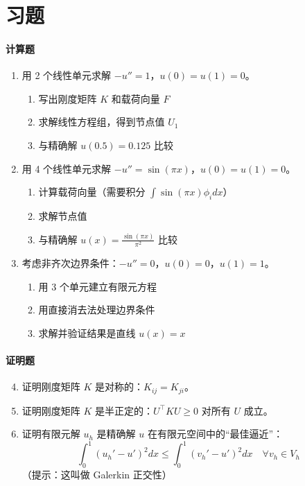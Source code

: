 \section{习题}

\paragraph{计算题}
\begin{enumerate}
    \item 用 2 个线性单元求解 $-u'' = 1$，$u(0) = u(1) = 0$。
    \begin{enumerate}
        \item 写出刚度矩阵 $K$ 和载荷向量 $F$
        \item 求解线性方程组，得到节点值 $U_1$
        \item 与精确解 $u(0.5) = 0.125$ 比较
    \end{enumerate}
    
    \item 用 4 个线性单元求解 $-u'' = \sin(\pi x)$，$u(0) = u(1) = 0$。
    \begin{enumerate}
        \item 计算载荷向量（需要积分 $\int \sin(\pi x) \phi_i dx$）
        \item 求解节点值
        \item 与精确解 $u(x) = \frac{\sin(\pi x)}{\pi^2}$ 比较
    \end{enumerate}
    
    \item 考虑非齐次边界条件：$-u'' = 0$，$u(0) = 0$，$u(1) = 1$。
    \begin{enumerate}
        \item 用 3 个单元建立有限元方程
        \item 用直接消去法处理边界条件
        \item 求解并验证结果是直线 $u(x) = x$
    \end{enumerate}
\end{enumerate}

\paragraph{证明题}
\begin{enumerate}
    \setcounter{enumi}{3}
    \item 证明刚度矩阵 $K$ 是对称的：$K_{ij} = K_{ji}$。
    
    \item 证明刚度矩阵 $K$ 是半正定的：$U^\top K U \geq 0$ 对所有 $U$ 成立。
    
    \item 证明有限元解 $u_h$ 是精确解 $u$ 在有限元空间中的“最佳逼近”：
    \[
    \int_0^1 (u_h' - u')^2 dx \leq \int_0^1 (v_h' - u')^2 dx \quad \forall v_h \in V_h
    \]
    （提示：这叫做 Galerkin 正交性）
\end{enumerate}

